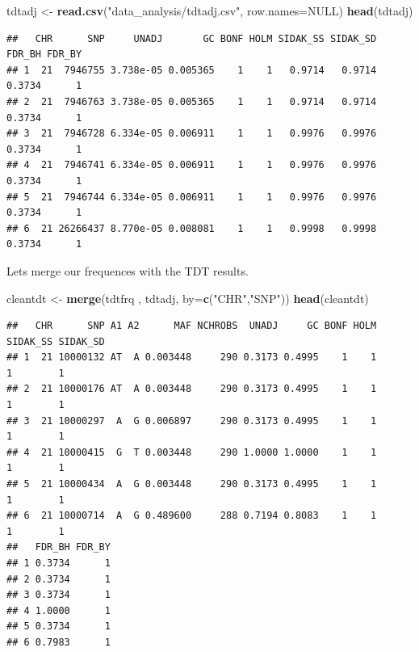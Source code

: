 \documentclass[
]{article}
\newenvironment{Shaded}{\begin{snugshade}}{\end{snugshade}}
\newcommand{\DataTypeTok}[1]{\textcolor[rgb]{0.13,0.29,0.53}{#1}}
\newcommand{\KeywordTok}[1]{\textcolor[rgb]{0.13,0.29,0.53}{\textbf{#1}}}
\newcommand{\NormalTok}[1]{#1}
\newcommand{\OtherTok}[1]{\textcolor[rgb]{0.56,0.35,0.01}{#1}}
\newcommand{\StringTok}[1]{\textcolor[rgb]{0.31,0.60,0.02}{#1}}
\begin{document}
\begin{Shaded}
\begin{Highlighting}[]
\NormalTok{tdtadj <-}\StringTok{ }\KeywordTok{read.csv}\NormalTok{(}\StringTok{"data_analysis/tdtadj.csv"}\NormalTok{, }\DataTypeTok{row.names=}\OtherTok{NULL}\NormalTok{)}
\KeywordTok{head}\NormalTok{(tdtadj)}
\end{Highlighting}
\end{Shaded}

\begin{verbatim}
##   CHR      SNP     UNADJ       GC BONF HOLM SIDAK_SS SIDAK_SD FDR_BH FDR_BY
## 1  21  7946755 3.738e-05 0.005365    1    1   0.9714   0.9714 0.3734      1
## 2  21  7946763 3.738e-05 0.005365    1    1   0.9714   0.9714 0.3734      1
## 3  21  7946728 6.334e-05 0.006911    1    1   0.9976   0.9976 0.3734      1
## 4  21  7946741 6.334e-05 0.006911    1    1   0.9976   0.9976 0.3734      1
## 5  21  7946744 6.334e-05 0.006911    1    1   0.9976   0.9976 0.3734      1
## 6  21 26266437 8.770e-05 0.008081    1    1   0.9998   0.9998 0.3734      1
\end{verbatim}

Lets merge our frequences with the TDT results.

\begin{Shaded}
\begin{Highlighting}[]
\NormalTok{cleantdt <-}\StringTok{ }\KeywordTok{merge}\NormalTok{(tdtfrq , tdtadj, }\DataTypeTok{by=}\KeywordTok{c}\NormalTok{(}\StringTok{"CHR"}\NormalTok{,}\StringTok{"SNP"}\NormalTok{))}
\KeywordTok{head}\NormalTok{(cleantdt)}
\end{Highlighting}
\end{Shaded}

\begin{verbatim}
##   CHR      SNP A1 A2      MAF NCHROBS  UNADJ     GC BONF HOLM SIDAK_SS SIDAK_SD
## 1  21 10000132 AT  A 0.003448     290 0.3173 0.4995    1    1        1        1
## 2  21 10000176 AT  A 0.003448     290 0.3173 0.4995    1    1        1        1
## 3  21 10000297  A  G 0.006897     290 0.3173 0.4995    1    1        1        1
## 4  21 10000415  G  T 0.003448     290 1.0000 1.0000    1    1        1        1
## 5  21 10000434  A  G 0.003448     290 0.3173 0.4995    1    1        1        1
## 6  21 10000714  A  G 0.489600     288 0.7194 0.8083    1    1        1        1
##   FDR_BH FDR_BY
## 1 0.3734      1
## 2 0.3734      1
## 3 0.3734      1
## 4 1.0000      1
## 5 0.3734      1
## 6 0.7983      1
\end{verbatim}
\end{document}
